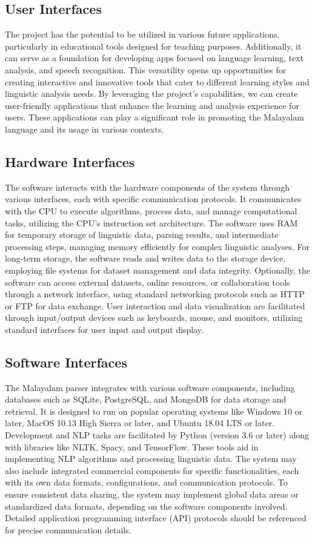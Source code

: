 \documentclass[12pt]{article}
\begin{document}
	\subsection{User Interfaces}
	The project has the potential to be utilized in various future applications, particularly in
	educational tools designed for teaching purposes. Additionally, it can serve as a foundation
	for developing apps focused on language learning, text analysis, and speech recognition.
	This versatility opens up opportunities for creating interactive and innovative tools that
	cater to different learning styles and linguistic analysis needs. By leveraging the project's
	capabilities, we can create user-friendly applications that enhance the learning and
	analysis experience for users. These applications can play a significant role in promoting
	the Malayalam language and its usage in various contexts.
	
	\subsection{Hardware Interfaces}
	The software interacts with the hardware components of the system through various
	interfaces, each with specific communication protocols. It communicates with the CPU to
	execute algorithms, process data, and manage computational tasks, utilizing the CPU's
	instruction set architecture. The software uses RAM for temporary storage of linguistic
	data, parsing results, and intermediate processing steps, managing memory efficiently for
	complex linguistic analyses. For long-term storage, the software reads and writes data to
	the storage device, employing file systems for dataset management and data integrity.
	Optionally, the software can access external datasets, online resources, or collaboration
	tools through a network interface, using standard networking protocols such as HTTP or
	FTP for data exchange. User interaction and data visualization are facilitated through
	input/output devices such as keyboards, mouse, and monitors, utilizing standard interfaces
	for user input and output display.
	
	\subsection{Software Interfaces}
	The Malayalam parser integrates with various software components, including databases
	such as SQLite, PostgreSQL, and MongoDB for data storage and retrieval. It is designed
	to run on popular operating systems like Windows 10 or later, MacOS 10.13 High Sierra or
	later, and Ubuntu 18.04 LTS or later. Development and NLP tasks are facilitated by Python
	(version 3.6 or later) along with libraries like NLTK, Spacy, and TensorFlow. These tools
	aid in implementing NLP algorithms and processing linguistic data. The system may also
	include integrated commercial components for specific functionalities, each with its own
	data formats, configurations, and communication protocols. To ensure consistent data
	sharing, the system may implement global data areas or standardized data formats,
	depending on the software components involved. Detailed application programming
	interface (API) protocols should be referenced for precise communication details.
	
\end{document}
